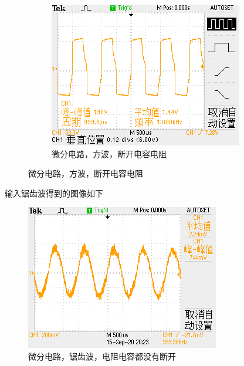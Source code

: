 \documentclass{ctexart}
\begin{document}
\begin{figure}[H]
\begin{subfigure}{.32\textwidth}
    \includegraphics[width=\linewidth]{电路图像/微分电路/输入方波/方波无电阻无电容}
    \caption{微分电路，方波，断开电容电阻}
  \end{subfigure}
\end{figure}

输入锯齿波得到的图像如下

\begin{figure}[H]
  \centering
  \includegraphics[width=0.96\linewidth]{电路图像/微分电路/输入锯齿波/三角波有电阻有电容}
  \caption{微分电路，锯齿波，电阻电容都没有断开}
\end{figure}
\end{document}
